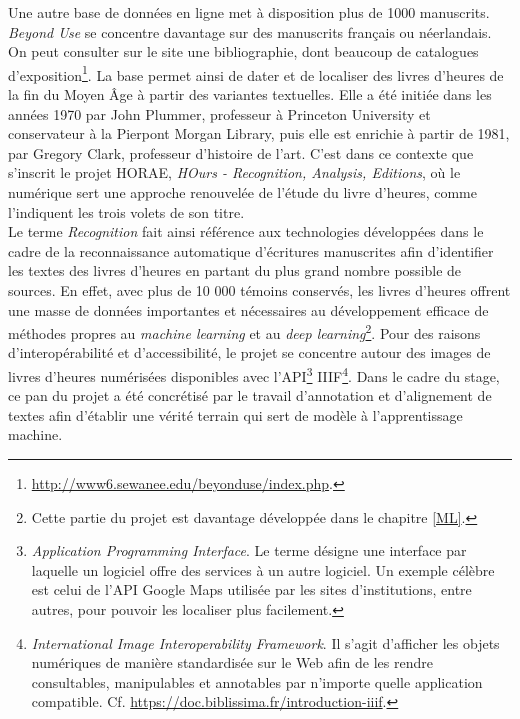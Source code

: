 \documentclass[a4paper,12pt,twoside]{book}
\begin{document}
Une autre base de données en ligne met à disposition plus de 1000 manuscrits. \textit{Beyond Use} se concentre davantage sur des manuscrits français ou néerlandais. On peut consulter sur le site une bibliographie, dont beaucoup de catalogues d'exposition\footnote{\url{http://www6.sewanee.edu/beyonduse/index.php}.}. La base permet ainsi de dater et de localiser des livres d’heures de la fin du Moyen Âge à partir des variantes textuelles. Elle a été initiée dans les années 1970 par John Plummer, professeur à Princeton University et conservateur à la Pierpont Morgan Library, puis elle est enrichie à partir de 1981, par Gregory Clark, professeur d'histoire de l'art. C'est dans ce contexte que s'inscrit le projet HORAE, \textit{HOurs - Recognition, Analysis, Editions}, où le numérique sert une approche renouvelée de l'étude du livre d'heures, comme l'indiquent les trois volets de son titre.  \\

Le terme \textit{Recognition} fait ainsi référence aux technologies développées dans le cadre de la reconnaissance automatique d'écritures manuscrites afin d'identifier les textes des livres d'heures en partant du plus grand nombre possible de sources. En effet, avec plus de 10 000 témoins conservés, les livres d'heures offrent une masse de données importantes et nécessaires au développement efficace de méthodes propres au \textit{machine learning} et au \textit{deep learning}\footnote{Cette partie du projet est davantage développée dans le chapitre \ref{ML}.}. Pour des raisons d'interopérabilité et d'accessibilité, le projet se concentre autour des images de livres d'heures numérisées disponibles avec l'API\footnote{\textit{Application Programming Interface}. Le terme désigne une interface par laquelle un logiciel offre des services à un autre logiciel. Un exemple célèbre est celui de l'API Google Maps utilisée par les sites d'institutions, entre autres, pour pouvoir les localiser plus facilement.} IIIF\footnote{\textit{International Image Interoperability Framework}. Il s'agit d'afficher les objets numériques de manière standardisée sur le Web afin de les rendre consultables, manipulables et annotables par n'importe quelle application compatible. Cf. \url{https://doc.biblissima.fr/introduction-iiif}.}. Dans le cadre du stage, ce pan du projet a été concrétisé par le travail d'annotation et d'alignement de textes afin d'établir une vérité terrain qui sert de modèle à l'apprentissage machine. 
\end{document}
